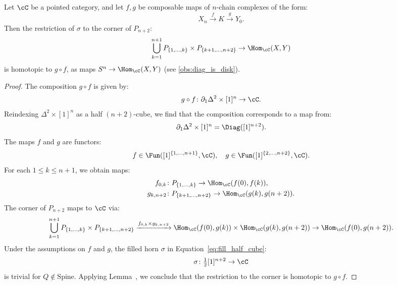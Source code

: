 \begin{lem}\label{lem:diff_is_comp}
Let $\cC$ be a pointed category, and let $f, g$ be composable maps of $n$-chain complexes of the form:
\begin{equation*}
    X_n \xrightarrow{f} K \xrightarrow{g} Y_0.
\end{equation*}
Then the restriction of $\sigma$ to the corner of $P_{n + 2}$:
\begin{equation*}
    \bigcup_{k = 1}^{n + 1} P_{\{1, \dots, k\}} \times P_{\{k + 1, \dots, n + 2\}} \to \Hom_{\cC}(X, Y)
\end{equation*}
is homotopic to $g \circ f$, as maps $S^n \to \Hom_{\cC}(X, Y)$ (see \cref{obs:diag_is_disk}).
\end{lem}
\begin{proof}
The composition $g \circ f$ is given by:
\begin{equation*}
    g \circ f \colon \partial_1 \Delta^2 \times [1]^n \to \cC.
\end{equation*}
Reindexing $\Delta^2 \times [1]^n$ as a half $(n + 2)$-cube, we find that the composition corresponds to a map from:
\begin{equation*}
    \partial_1 \Delta^2 \times [1]^n = \Diag([1]^{n + 2}).
\end{equation*}
The maps $f$ and $g$ are functors:
\begin{equation*}
    f \in \Fun([1]^{\{1, \dots, n + 1\}}, \cC), \quad g \in \Fun([1]^{\{2, \dots, n + 2\}}, \cC).
\end{equation*}
For each $1 \leq k \leq n + 1$, we obtain maps:
\begin{align*}
    f_{0, k} &\colon P_{\{1, \dots, k\}} \to \Hom_{\cC}(f(0), f(k)), \\
    g_{k, n + 2} &\colon P_{\{k + 1, \dots, n + 2\}} \to \Hom_{\cC}(g(k), g(n + 2)).
\end{align*}
The corner of $P_{n + 2}$ maps to $\cC$ via:
\begin{equation*}
    \bigcup_{k = 1}^{n + 1} P_{\{1, \dots, k\}} \times P_{\{k + 1, \dots, n + 2\}} \xrightarrow{f_{0, k} \times g_{k, n + 2}} \Hom_{\cC}(f(0), g(k)) \times \Hom_{\cC}(g(k), g(n + 2)) \to \Hom_{\cC}(f(0), g(n + 2)).
\end{equation*}
Under the assumptions on $f$ and $g$, the filled horn $\sigma$ in Equation~\cref{eq:fill_half_cube}:
\begin{equation*}
    \sigma \colon \tfrac{1}{2}[1]^{n + 2} \to \cC
\end{equation*}
is trivial for $Q \notin \text{Spine}$. Applying Lemma~, we conclude that the restriction to the corner is homotopic to $g \circ f$.
\end{proof}
